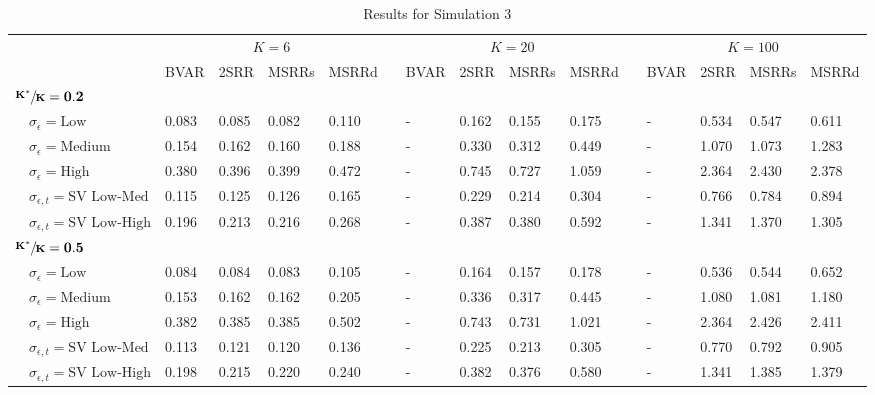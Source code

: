 \begin{table}[!tbp]
\caption{Results for Simulation 3\label{s1_table}} 
\begin{center}
\begin{tabular}{lllllcllllcllll}
\hline\hline
\multicolumn{1}{l}{\bfseries }&\multicolumn{4}{c}{\bfseries $K=6$}&\multicolumn{1}{c}{\bfseries }&\multicolumn{4}{c}{\bfseries $K=20$}&\multicolumn{1}{c}{\bfseries }&\multicolumn{4}{c}{\bfseries $K=100$}\tabularnewline
\cline{2-5} \cline{7-10} \cline{12-15}
\multicolumn{1}{l}{}&\multicolumn{1}{c}{BVAR}&\multicolumn{1}{c}{2SRR}&\multicolumn{1}{c}{MSRRs}&\multicolumn{1}{c}{MSRRd}&\multicolumn{1}{c}{}&\multicolumn{1}{c}{BVAR}&\multicolumn{1}{c}{2SRR}&\multicolumn{1}{c}{MSRRs}&\multicolumn{1}{c}{MSRRd}&\multicolumn{1}{c}{}&\multicolumn{1}{c}{BVAR}&\multicolumn{1}{c}{2SRR}&\multicolumn{1}{c}{MSRRs}&\multicolumn{1}{c}{MSRRd}\tabularnewline
\hline
{\bfseries $\mathbf{\sfrac{K^*}{K}=0.2}$}&&&&&&&&&&&&&&\tabularnewline
~~$\sigma_{\epsilon} =\text{Low}$& 0.083& 0.085& 0.082& 0.110&&-& 0.162& 0.155& 0.175&&-& 0.534& 0.547& 0.611\tabularnewline
~~$\sigma_{\epsilon} =\text{Medium}$& 0.154& 0.162& 0.160& 0.188&&-& 0.330& 0.312& 0.449&&-& 1.070& 1.073& 1.283\tabularnewline
~~$\sigma_{\epsilon} =\text{High}$& 0.380& 0.396& 0.399& 0.472&&-& 0.745& 0.727& 1.059&&-& 2.364& 2.430& 2.378\tabularnewline
~~$\sigma_{\epsilon,t} = \text{SV Low-Med}$& 0.115& 0.125& 0.126& 0.165&&-& 0.229& 0.214& 0.304&&-& 0.766& 0.784& 0.894\tabularnewline
~~$\sigma_{\epsilon,t}  = \text{SV Low-High}$& 0.196& 0.213& 0.216& 0.268&&-& 0.387& 0.380& 0.592&&-& 1.341& 1.370& 1.305\tabularnewline
\hline
{\bfseries $\mathbf{\sfrac{K^*}{K}=0.5}$}&&&&&&&&&&&&&&\tabularnewline
~~$\sigma_{\epsilon} =\text{Low}$& 0.084& 0.084& 0.083& 0.105&&-& 0.164& 0.157& 0.178&&-& 0.536& 0.544& 0.652\tabularnewline
~~$\sigma_{\epsilon} =\text{Medium}$& 0.153& 0.162& 0.162& 0.205&&-& 0.336& 0.317& 0.445&&-& 1.080& 1.081& 1.180\tabularnewline
~~$\sigma_{\epsilon} =\text{High}$& 0.382& 0.385& 0.385& 0.502&&-& 0.743& 0.731& 1.021&&-& 2.364& 2.426& 2.411\tabularnewline
~~$\sigma_{\epsilon,t} = \text{SV Low-Med}$& 0.113& 0.121& 0.120& 0.136&&-& 0.225& 0.213& 0.305&&-& 0.770& 0.792& 0.905\tabularnewline
~~$\sigma_{\epsilon,t}  = \text{SV Low-High}$& 0.198& 0.215& 0.220& 0.240&&-& 0.382& 0.376& 0.580&&-& 1.341& 1.385& 1.379\tabularnewline

\end{tabular}
\end{center}
\end{table}
